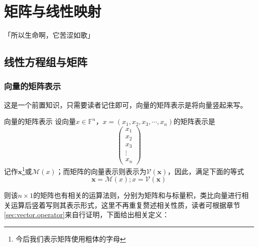 \newcommand\myarrow{%
  \tikz\draw[thick,->] (0,0) -- ++(0,-1.1);
}

\chapter{矩阵与线性映射}
\begin{center}
	「所以生命啊，它苦涩如歌」
\end{center}
\vspace{-5pt}
\begin{center}
\end{center}

\section{线性方程组与矩阵}

\subsection{向量的矩阵表示}

这是一个前置知识，只需要读者记住即可，向量的矩阵表示是将向量竖起来写。

\begin{definition}{向量的矩阵表示}
	设向量$x\in \mathbb{F}^n$，$x=(x_1,x_2,x_3,\cdots,x_n)$的矩阵表示是$$\begin{pmatrix}  
		x_1 \\  
		x_2 \\
		x_3 \\
		\vdots \\
		x_n
	  \end{pmatrix} 
	$$记作$\boldsymbol{x}$\footnote{今后我们表示矩阵使用粗体的字母}或$\mathcal{M}(x)$；而矩阵的向量表示则表示为$\mathcal{V}(\boldsymbol{x})$，因此，满足下面的等式$$\boldsymbol{x}=\mathcal{M}(x);x=\mathcal{V}(\boldsymbol{x})$$
\end{definition}

则该$n\times 1$的矩阵也有相关的运算法则，分别为矩阵和与标量积，类比向量进行相关运算后竖着写则其表示形式，这里不再重复赘述相关性质，读者可根据章节\ref{sec:vector.operator}来自行证明，下面给出相关定义：


